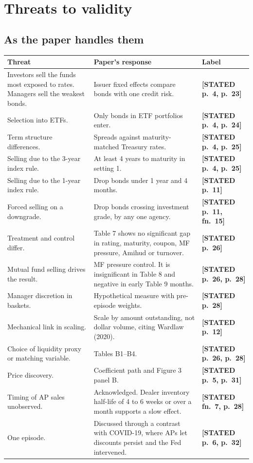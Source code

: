 \documentclass[10pt,a4paper]{article}
\newcommand{\ST}[1]{\textcolor{cst}{\textbf{[STATED #1]}}}
\begin{document}
\section{Threats to validity}\label{sec:threats}

\subsection{As the paper handles them}
\begin{longtable}{@{}P{5.2cm}P{8.8cm}P{3cm}@{}}
\toprule
Threat & Paper's response & Label\\
\midrule\endhead
Investors sell the funds most exposed to rates. Managers sell the weakest bonds. & Issuer fixed effects compare bonds with one credit risk. & \ST{p.~4, p.~23}\\
Selection into ETFs. & Only bonds in ETF portfolios enter. & \ST{p.~4, p.~24}\\
Term structure differences. & Spreads against maturity-matched Treasury rates. & \ST{p.~4, p.~25}\\
Selling due to the 3-year index rule. & At least 4 years to maturity in setting 1. & \ST{p.~4, p.~25}\\
Selling due to the 1-year index rule. & Drop bonds under 1 year and 4 months. & \ST{p.~11}\\
Forced selling on a downgrade. & Drop bonds crossing investment grade, by any one agency. & \ST{p.~11, fn.~15}\\
Treatment and control differ. & Table 7 shows no significant gap in rating, maturity, coupon, MF pressure, Amihud or turnover. & \ST{p.~26}\\
Mutual fund selling drives the result. & MF pressure control. It is insignificant in Table 8 and negative in early Table 9 months. & \ST{p.~26, p.~28}\\
Manager discretion in baskets. & Hypothetical measure with pre-episode weights. & \ST{p.~28}\\
Mechanical link in scaling. & Scale by amount outstanding, not dollar volume, citing Wardlaw (2020). & \ST{p.~12}\\
Choice of liquidity proxy or matching variable. & Tables B1--B4. & \ST{p.~26, p.~28}\\
Price discovery. & Coefficient path and Figure 3 panel B. & \ST{p.~5, p.~31}\\
Timing of AP sales unobserved. & Acknowledged. Dealer inventory half-life of 4 to 6 weeks or over a month supports a slow effect. & \ST{fn.~7, p.~28}\\
One episode. & Discussed through a contrast with COVID-19, where APs let discounts persist and the Fed intervened. & \ST{p.~6, p.~32}\\
\bottomrule
\end{longtable}
\end{document}
